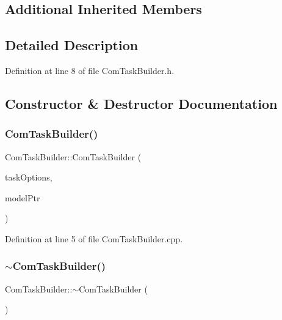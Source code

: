 \subsection*{Additional Inherited Members}


\subsection{Detailed Description}


Definition at line 8 of file Com\+Task\+Builder.\+h.



\subsection{Constructor \& Destructor Documentation}
\hypertarget{classocra_1_1ComTaskBuilder_aa3cffa7682c1122e7e5bfa533a66f9bc}{}\label{classocra_1_1ComTaskBuilder_aa3cffa7682c1122e7e5bfa533a66f9bc} 
\subsubsection{\texorpdfstring{Com\+Task\+Builder()}{ComTaskBuilder()}}
{\footnotesize\ttfamily Com\+Task\+Builder\+::\+Com\+Task\+Builder (\begin{DoxyParamCaption}\item[{const \hyperlink{classocra_1_1TaskBuilderOptions}{Task\+Builder\+Options} \&}]{task\+Options,  }\item[{Model\+::\+Ptr}]{model\+Ptr }\end{DoxyParamCaption})}



Definition at line 5 of file Com\+Task\+Builder.\+cpp.

\hypertarget{classocra_1_1ComTaskBuilder_a17a4747e20d9e37f734a9f27820d068d}{}\label{classocra_1_1ComTaskBuilder_a17a4747e20d9e37f734a9f27820d068d} 
\subsubsection{\texorpdfstring{$\sim$\+Com\+Task\+Builder()}{~ComTaskBuilder()}}
{\footnotesize\ttfamily Com\+Task\+Builder\+::$\sim$\+Com\+Task\+Builder (\begin{DoxyParamCaption}{ }\end{DoxyParamCaption})\hspace{0.3cm}{\ttfamily [virtual]}}



